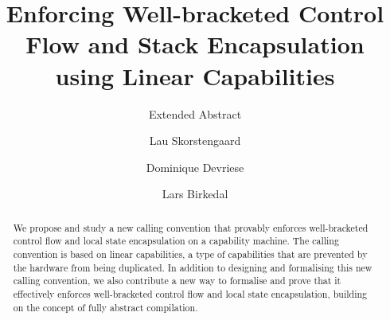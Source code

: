\documentclass[sigplan,screen]{acmart}
\begin{document}
\title{Enforcing Well-bracketed Control Flow and Stack Encapsulation using Linear Capabilities}
\subtitle{Extended Abstract}

\author{Lau Skorstengaard}

\author{Dominique Devriese}

\author{Lars Birkedal}


\begin{abstract}
We propose and study a new calling convention that provably enforces well-bracketed control flow and local state encapsulation on a capability machine.
The calling convention is based on linear capabilities, a type of capabilities that are prevented by the hardware from being duplicated.
In addition to designing and formalising this new calling convention, we also contribute a new way to formalise and prove that it effectively enforces well-bracketed control flow and local state encapsulation, building on the concept of fully abstract compilation.
\end{abstract}

%
%
\end{document}
